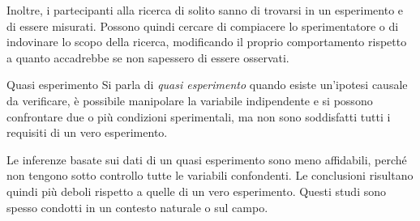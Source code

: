 \documentclass[a4paper]{article}
\begin{document}
Inoltre, i partecipanti alla ricerca di solito sanno di trovarsi in un esperimento e di essere misurati. Possono quindi cercare di compiacere lo sperimentatore o di indovinare lo scopo della ricerca, modificando il proprio comportamento rispetto a quanto accadrebbe se non sapessero di essere osservati.
\begin{snippetdefinition}{Quasi esperimento}
    Si parla di \emph{quasi esperimento} quando esiste un'ipotesi causale da verificare, è possibile manipolare la variabile indipendente e si possono confrontare due o più condizioni sperimentali, ma non sono soddisfatti tutti i requisiti di un vero esperimento.
\end{snippetdefinition}
Le inferenze basate sui dati di un quasi esperimento sono meno affidabili, perché non tengono sotto controllo tutte le variabili confondenti. Le conclusioni risultano quindi più deboli rispetto a quelle di un vero esperimento. Questi studi sono spesso condotti in un contesto naturale o sul campo.
\end{document}
